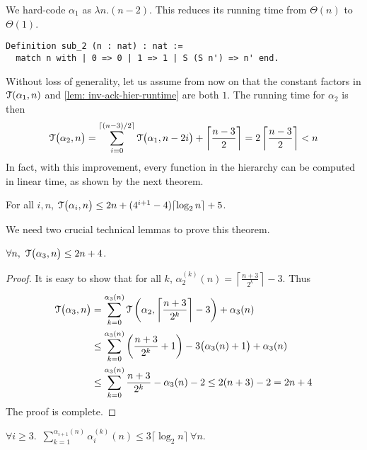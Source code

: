 We hard-code $\alpha_1$ as $\lambda n.(n-2)$. This reduces its running time 
from $\Theta(n)$ to $\Theta(1)$.
\begin{lstlisting}
Definition sub_2 (n : nat) : nat := 
  match n with | 0 => 0 | 1 => 1 | S (S n') => n' end.
\end{lstlisting}
Without loss of generality, let us assume from now on that the constant factors in $\mathcal{T}(\alpha_1, n)$ and \cref{lem: inv-ack-hier-runtime} are both $1$. The running time for $\alpha_2$ is then
\begin{equation*}
\mathcal{T}\big(\alpha_2, n\big)
 = \sum_{i=0}^{\lceil (n-3)/2 \rceil} \mathcal{T} \big(\alpha_1, n-2i\big) + \left\lceil \frac{n-3}{2} \right\rceil =  2\left\lceil \frac{n-3}{2} \right\rceil
 < n 
\end{equation*}
In fact, with this improvement, every function in the hierarchy can be computed in linear time, as shown by the next theorem.
\begin{thm} \label{thm: inv-ack-hier-runtime-improved}
	For all $i, n$, $\mathcal{T}\big(\alpha_i, n\big) \le 2n + (4^{i+1} - 4)\lceil \log_2n\rceil + 5$.
\end{thm}
We need two crucial technical lemmas to prove this theorem.
\begin{lem} \label{lem: inv-ack-3-runtime}
	$\forall n,~\mathcal{T}\big(\alpha_3, n\big) \le 2n + 4$.
\end{lem}
\begin{proof}
	It is easy to show that for all $k$, $\alpha_2^{(k)}(n) = \left\lceil \frac{n+3}{2^k} \right\rceil - 3$. Thus
	\begin{equation*}
	\begin{aligned}
	\mathcal{T}\big(\alpha_3, n\big) & =
	\sum_{k=0}^{\alpha_{3}(n)}\mathcal{T}\left(\alpha_2, \left\lceil \frac{n+3}{2^k} \right\rceil - 3\right) + \alpha_{3}(n)  \\ 
	& \le \sum_{k=0}^{\alpha_3(n)}\left(\frac{n+3}{2^k} + 1\right) - 3\big(\alpha_3(n) + 1\big) + \alpha_3(n) \\
	& \le \sum_{k=0}^{\alpha_3(n)}\frac{n+3}{2^k} - \alpha_3(n) - 2 \le 2(n+3) - 2 = 2n + 4
	\end{aligned}
	\end{equation*}
	The proof is complete.
\end{proof}
\begin{lem} \label{lem: sum-alpha-repeat}
	$\forall i \ge 3$.~$\displaystyle \sum_{k=1}^{\alpha_{i+1}(n)} \alpha_i^{(k)}(n) \le 3\big\lceil \log_2n \big\rceil \ \forall n$.
\end{lem}
